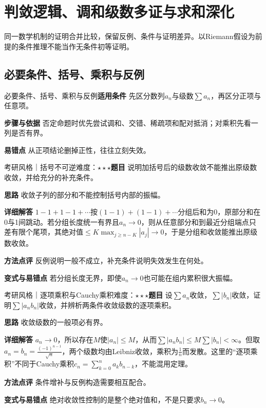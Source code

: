\section{判敛逻辑、调和级数多证与求和深化}\label{deep:series_source_deep}

\begin{examtip}同一数学机制的证明合并比较，保留反例、条件与证明差异。以Riemann假设为前提的条件推理不能当作无条件初等证明。\end{examtip}

\subsection{必要条件、括号、乘积与反例}\label{deep:series_source_deep:logic}

\begin{method}{必要条件、括号、乘积与反例}\textbf{适用条件} 先区分数列$a_n$与级数$\sum a_n$，再区分正项与任意项。\par\textbf{步骤与依据} 否定命题时优先尝试调和、交错、稀疏项和配对抵消；对乘积先看一列是否有界。\par\textbf{易错点} 从正项结论删掉正性，往往立刻失效。\end{method}

\begin{example}{考研风格｜括号不可逆}{难度：$\star\star\star$}\label{deep:ex:series_source_deep:block}\textbf{题目} 说明加括号后的级数收敛不能推出原级数收敛，并给充分的补充条件。\par\textbf{思路} 收敛子列的部分和不能控制括号内部的振幅。\par\textbf{详细解答} $1-1+1-1+\cdots$按$(1-1)+(1-1)+\cdots$分组后和为0，原部分和在0与1间跳动。若分组长度统一有界且$a_n\to0$，则从任意部分和到最近分组端点只差有限个尾项，其绝对值$\le K\max_{j\ge n-K}|a_j|\to0$，于是分组和收敛能推出原级数收敛。\par\textbf{方法点评} 反例说明一般不成立，补充条件说明失效发生在何处。\par\textbf{变式与易错点} 若分组长度无界，即使$a_n\to0$也可能在组内累积很大振幅。\end{example}

\begin{example}{考研风格｜逐项乘积与Cauchy乘积}{难度：$\star\star\star$}\label{deep:ex:series_source_deep:product}\textbf{题目} 设$\sum a_n$收敛，$\sum|b_n|$收敛，证明$\sum|a_nb_n|$收敛，并辨析两条件收敛级数的逐项乘积。\par\textbf{思路} 收敛级数的一般项必有界。\par\textbf{详细解答} $a_n\to0$，所以存在$M$使$|a_n|\le M$，从而$\sum|a_nb_n|\le M\sum|b_n|<\infty$。但取$a_n=b_n=\frac{(-1)^{n-1}}{\sqrt n}$，两个级数均由Leibniz收敛，乘积为$\frac{1}{n}$而发散。这里的“逐项乘积”不同于Cauchy乘积$c_n=\sum_{k=0}^na_kb_{n-k}$，不能混用定理。\par\textbf{方法点评} 条件增补与反例构造需要相互配合。\par\textbf{变式与易错点} 绝对收敛性控制的是整个绝对值和，不是只要求$b_n\to0$。\end{example}


